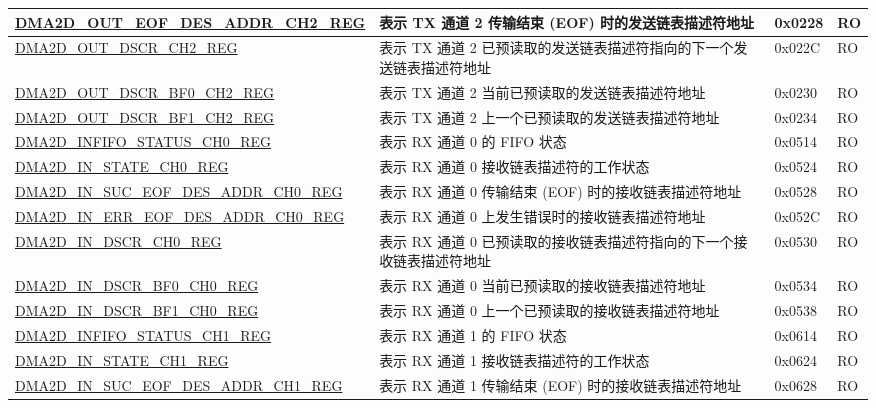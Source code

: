 \begin{longtable}{ | p{7cm} | p{11.5cm} | p{1.3cm} | p{2cm} | }
\hyperref[regdesc:DMA2DOUTEOFDESADDRCHNREG]{DMA2D\_OUT\_EOF\_DES\_ADDR\_CH2\_REG} & 表示 TX 通道 2 传输结束 (EOF) 时的发送链表描述符地址 & 0x0228 & RO \\ \hline
\hyperref[regdesc:DMA2DOUTDSCRCHNREG]{DMA2D\_OUT\_DSCR\_CH2\_REG} & 表示 TX 通道 2 已预读取的发送链表描述符指向的下一个发送链表描述符地址 & 0x022C & RO \\ \hline
\hyperref[regdesc:DMA2DOUTDSCRBF0CHNREG]{DMA2D\_OUT\_DSCR\_BF0\_CH2\_REG} & 表示 TX 通道 2 当前已预读取的发送链表描述符地址 & 0x0230 & RO \\ \hline
\hyperref[regdesc:DMA2DOUTDSCRBF1CHNREG]{DMA2D\_OUT\_DSCR\_BF1\_CH2\_REG} & 表示 TX 通道 2 上一个已预读取的发送链表描述符地址 & 0x0234 & RO \\ \hline
\hyperref[regdesc:DMA2DINFIFOSTATUSCHNREG]{DMA2D\_INFIFO\_STATUS\_CH0\_REG} & 表示 RX 通道 0 的 FIFO 状态 & 0x0514 & RO \\ \hline
\hyperref[regdesc:DMA2DINSTATECHNREG]{DMA2D\_IN\_STATE\_CH0\_REG} & 表示 RX 通道 0 接收链表描述符的工作状态 & 0x0524 & RO \\ \hline
\hyperref[regdesc:DMA2DINSUCEOFDESADDRCHNREG]{DMA2D\_IN\_SUC\_EOF\_DES\_ADDR\_CH0\_REG} & 表示 RX 通道 0 传输结束 (EOF) 时的接收链表描述符地址 & 0x0528 & RO \\ \hline
\hyperref[regdesc:DMA2DINERREOFDESADDRCHNREG]{DMA2D\_IN\_ERR\_EOF\_DES\_ADDR\_CH0\_REG} & 表示 RX 通道 0 上发生错误时的接收链表描述符地址 & 0x052C & RO \\ \hline
\hyperref[regdesc:DMA2DINDSCRCHNREG]{DMA2D\_IN\_DSCR\_CH0\_REG} & 表示 RX 通道 0 已预读取的接收链表描述符指向的下一个接收链表描述符地址 & 0x0530 & RO \\ \hline
\hyperref[regdesc:DMA2DINDSCRBF0CHNREG]{DMA2D\_IN\_DSCR\_BF0\_CH0\_REG} & 表示 RX 通道 0 当前已预读取的接收链表描述符地址 & 0x0534 & RO \\ \hline
\hyperref[regdesc:DMA2DINDSCRBF1CHNREG]{DMA2D\_IN\_DSCR\_BF1\_CH0\_REG} & 表示 RX 通道 0 上一个已预读取的接收链表描述符地址 & 0x0538 & RO \\ \hline
\hyperref[regdesc:DMA2DINFIFOSTATUSCHNREG]{DMA2D\_INFIFO\_STATUS\_CH1\_REG} & 表示 RX 通道 1 的 FIFO 状态 & 0x0614 & RO \\ \hline
\hyperref[regdesc:DMA2DINSTATECHNREG]{DMA2D\_IN\_STATE\_CH1\_REG} & 表示 RX 通道 1 接收链表描述符的工作状态 & 0x0624 & RO \\ \hline
\hyperref[regdesc:DMA2DINSUCEOFDESADDRCHNREG]{DMA2D\_IN\_SUC\_EOF\_DES\_ADDR\_CH1\_REG} & 表示 RX 通道 1 传输结束 (EOF) 时的接收链表描述符地址 & 0x0628 & RO \\ \hline

\end{longtable}
